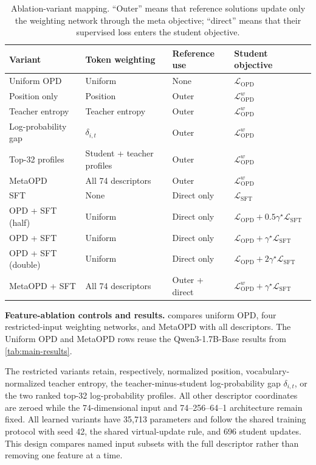 \documentclass{article}
\theoremstyle{plain}
\theoremstyle{definition}
\theoremstyle{remark}
\begin{document}
\begin{table}[t]
\centering
\small
\setlength{\tabcolsep}{5pt}
\renewcommand{\arraystretch}{1.08}
\caption{Ablation-variant mapping. ``Outer'' means that reference solutions update only the weighting network through the meta objective; ``direct'' means that their supervised loss enters the student objective.}
\label{tab:ablation-variants}
\begin{tabular}{@{}p{}p{}p{}p{}@{}}
\toprule
Variant & Token weighting & Reference use & Student objective \\
\midrule
Uniform OPD & Uniform & None & \(\mathcal L_{\mathrm{OPD}}\) \\
Position only & Position & Outer & \(\mathcal L_{\mathrm{OPD}}^w\) \\
Teacher entropy & Teacher entropy & Outer & \(\mathcal L_{\mathrm{OPD}}^w\) \\
Log-probability gap & \(\delta_{i,t}\) & Outer & \(\mathcal L_{\mathrm{OPD}}^w\) \\
Top-32 profiles & Student + teacher profiles & Outer & \(\mathcal L_{\mathrm{OPD}}^w\) \\
MetaOPD & All 74 descriptors & Outer & \(\mathcal L_{\mathrm{OPD}}^w\) \\
SFT & None & Direct only & \(\mathcal L_{\mathrm{SFT}}\) \\
OPD + SFT (half) & Uniform & Direct only & \(\mathcal L_{\mathrm{OPD}}+0.5\gamma^\star\mathcal L_{\mathrm{SFT}}\) \\
OPD + SFT & Uniform & Direct only & \(\mathcal L_{\mathrm{OPD}}+\gamma^\star\mathcal L_{\mathrm{SFT}}\) \\
OPD + SFT (double) & Uniform & Direct only & \(\mathcal L_{\mathrm{OPD}}+2\gamma^\star\mathcal L_{\mathrm{SFT}}\) \\
MetaOPD + SFT & All 74 descriptors & Outer + direct & \(\mathcal L_{\mathrm{OPD}}^w+\gamma^\star\mathcal L_{\mathrm{SFT}}\) \\
\bottomrule
\end{tabular}
\end{table}

\textbf{Feature-ablation controls and results.}
 compares uniform OPD, four restricted-input weighting networks, and MetaOPD with all descriptors. The Uniform OPD and MetaOPD rows reuse the Qwen3-1.7B-Base results from \cref{tab:main-results}.

The restricted variants retain, respectively, normalized position, vocabulary-normalized teacher entropy, the teacher-minus-student log-probability gap \(\delta_{i,t}\), or the two ranked top-32 log-probability profiles. All other descriptor coordinates are zeroed while the 74-dimensional input and 74--256--64--1 architecture remain fixed. All learned variants have 35,713 parameters and follow the shared training protocol with seed 42, the shared virtual-update rule, and 696 student updates. This design compares named input subsets with the full descriptor rather than removing one feature at a time.
\end{document}
